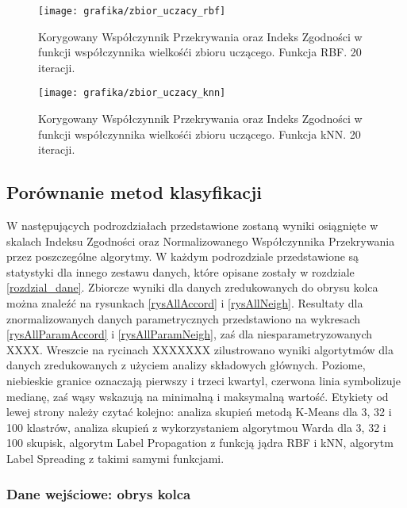 \documentclass{article}
\begin{document}
\begin{figure}
\texttt{[image: grafika/zbior\_uczacy\_rbf]}
\caption{Korygowany Współczynnik Przekrywania oraz Indeks Zgodności w funkcji współczynnika wielkośći zbioru uczącego. Funkcja RBF. 20 iteracji.}
\label{rysZbiorRbf}
\end{figure}

\begin{figure}
\texttt{[image: grafika/zbior\_uczacy\_knn]}
\caption{Korygowany Współczynnik Przekrywania oraz Indeks Zgodności w funkcji współczynnika wielkośći zbioru uczącego. Funkcja kNN. 20 iteracji.}
\label{rysZbiorKnn}

\end{figure}


\FloatBarrier
\subsection{Porównanie metod klasyfikacji}
W następujących podrozdziałach przedstawione zostaną wyniki osiągnięte w skalach Indeksu Zgodności oraz Normalizowanego Współczynnika Przekrywania przez poszczególne algorytmy.
W każdym podrozdziale przedstawione są statystyki dla innego zestawu danych, które opisane zostały w rozdziale \ref{rozdzial_dane}.
Zbiorcze wyniki dla danych zredukowanych do obrysu kolca można znaleźć na rysunkach \ref{rysAllAccord} i \ref{rysAllNeigh}.
Resultaty dla znormalizowanych danych parametrycznych przedstawiono na wykresach \ref{rysAllParamAccord} i \ref{rysAllParamNeigh}, zaś dla niesparametryzowanych XXXX.
Wreszcie na rycinach XXXXXXX zilustrowano wyniki algortytmów dla danych zredukowanych z użyciem analizy składowych głównych.
Poziome, niebieskie granice oznaczają pierwszy i trzeci kwartyl, czerwona linia symbolizuje medianę, zaś wąsy wskazują na minimalną i maksymalną wartość.
Etykiety od lewej strony należy czytać kolejno: analiza skupień metodą K-Means dla 3, 32 i 100 klastrów, analiza skupień z wykorzystaniem algorytmou Warda dla 3, 32 i 100 skupisk, algorytm Label Propagation z funkcją jądra RBF i kNN, algorytm Label Spreading z takimi samymi funkcjami.

\subsubsection{Dane wejściowe: obrys kolca}
\label{rozPorObrys}
\end{document}
